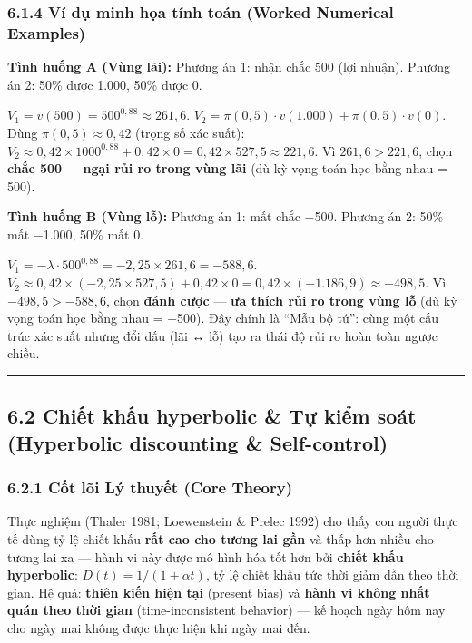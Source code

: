 \documentclass[
]{article}
\begin{document}
\subsubsection{6.1.4 Ví dụ minh họa tính toán (Worked Numerical
Examples)}\label{vuxed-dux1ee5-minh-hux1ecda-tuxednh-touxe1n-worked-numerical-examples-8}

\textbf{Tình huống A (Vùng lãi):} Phương án 1: nhận chắc 500 (lợi
nhuận). Phương án 2: 50\% được 1.000, 50\% được 0.

\(V_1 = v(500) = 500^{0,88} \approx 261{,}6\).
\(V_2 = \pi(0{,}5) \cdot v(1.000) + \pi(0{,}5) \cdot v(0)\). Dùng
\(\pi(0{,}5) \approx 0{,}42\) (trọng số xác suất):
\(V_2 \approx 0{,}42 \times 1000^{0,88} + 0{,}42 \times 0 = 0{,}42 \times 527{,}5 \approx 221{,}6\).
Vì \(261{,}6 > 221{,}6\), chọn \textbf{chắc 500} --- \textbf{ngại rủi ro
trong vùng lãi} (dù kỳ vọng toán học bằng nhau = 500).

\textbf{Tình huống B (Vùng lỗ):} Phương án 1: mất chắc −500. Phương án
2: 50\% mất −1.000, 50\% mất 0.

\(V_1 = -\lambda \cdot 500^{0,88} = -2{,}25 \times 261{,}6 = -588{,}6\).
\(V_2 \approx 0{,}42 \times (-2{,}25 \times 527{,}5) + 0{,}42 \times 0 = 0{,}42 \times (-1.186{,}9) \approx -498{,}5\).
Vì \(-498{,}5 > -588{,}6\), chọn \textbf{đánh cược} --- \textbf{ưa thích
rủi ro trong vùng lỗ} (dù kỳ vọng toán học bằng nhau = −500). Đây chính
là ``Mẫu bộ tứ'': cùng một cấu trúc xác suất nhưng đổi dấu (lãi ↔ lỗ)
tạo ra thái độ rủi ro hoàn toàn ngược chiều.

\begin{center}\rule{0.5\linewidth}{0.5pt}\end{center}

\subsection{6.2 Chiết khấu hyperbolic \& Tự kiểm soát (Hyperbolic
discounting \&
Self-control)}\label{chiux1ebft-khux1ea5u-hyperbolic-tux1ef1-kiux1ec3m-souxe1t-hyperbolic-discounting-self-control}

\subsubsection{6.2.1 Cốt lõi Lý thuyết (Core
Theory)}\label{cux1ed1t-luxf5i-luxfd-thuyux1ebft-core-theory-9}

Thực nghiệm (Thaler 1981; Loewenstein \& Prelec 1992) cho thấy con người
thực tế dùng tỷ lệ chiết khấu \textbf{rất cao cho tương lai gần} và thấp
hơn nhiều cho tương lai xa --- hành vi này được mô hình hóa tốt hơn bởi
\textbf{chiết khấu hyperbolic}: \(D(t) = 1/(1 + \alpha t)\), tỷ lệ chiết
khấu tức thời giảm dần theo thời gian. Hệ quả: \textbf{thiên kiến hiện
tại} (present bias) và \textbf{hành vi không nhất quán theo thời gian}
(time-inconsistent behavior) --- kế hoạch ngày hôm nay cho ngày mai
không được thực hiện khi ngày mai đến.
\end{document}
